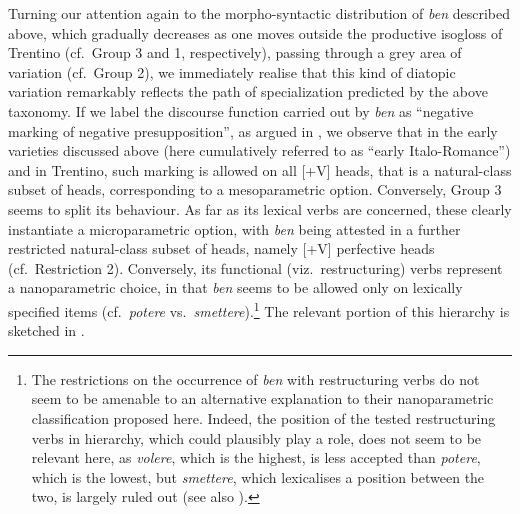 \documentclass[output=paper]{langsci/langscibook}
\begin{document}
Turning our attention again to the morpho-syntactic distribution of \emph{ben}
described above, which gradually decreases as one moves outside the productive
isogloss of Trentino (cf.\ Group 3 and 1, respectively), passing through a grey
area of variation (cf.\ Group 2), we immediately realise that this kind of
diatopic variation remarkably reflects the path of specialization predicted by
the above taxonomy. If we label the discourse function carried out by
\emph{ben} as \enquote{negative marking of negative presupposition}, as argued in
\textcite{CognSchi2018b}, we observe that in the early varieties discussed
above (here cumulatively referred to as \enquote{early Italo-Romance}) and in Trentino,
such marking is allowed on all [+V] heads, that is a natural-class subset of
heads, corresponding to a mesoparametric option. Conversely, Group 3 seems to
split its behaviour. As far as its lexical verbs are concerned, these clearly
instantiate a microparametric option, with \emph{ben} being attested in a
further restricted natural-class subset of heads, namely [+V] perfective heads
(cf.\ Restriction 2). Conversely, its functional (viz.\ restructuring) verbs
represent a nanoparametric choice, in that \emph{ben} seems to be allowed only
on lexically specified items (cf.\ \emph{potere} vs.\
\emph{smettere}).\footnote{The restrictions on the occurrence of \emph{ben} with
    restructuring verbs do not seem to be amenable to an alternative
    explanation to their nanoparametric classification proposed here. Indeed,
    the position of the tested restructuring verbs in \citegen{Cinque2006}
    hierarchy, which could plausibly play a role, does not seem to be relevant
    here, as \emph{volere}, which is the highest, is less accepted than
    \emph{potere}, which is the lowest, but \emph{smettere}, which lexicalises
    a position between the two, is largely ruled out (see also
\citealt{CognSchi2018}).} The relevant portion of this hierarchy is sketched
in \figref{ex:schifano:12.15}.
\end{document}
